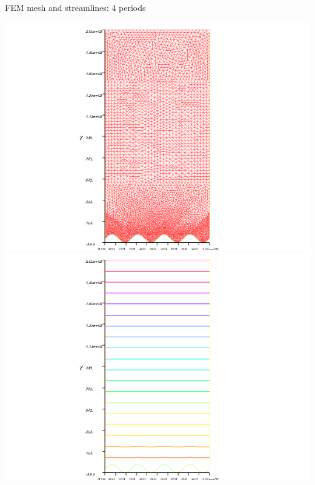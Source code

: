 \documentclass{beamer}
\begin{document}
\begin{frame}{FEM mesh and streamlines: 4 periods}

\begin{center}
\includegraphics[scale=0.4, trim=4cm 0cm 4cm 0cm, clip=true]{FEM_mesh_4.png}
\includegraphics[scale=0.4, trim=4cm 0cm 4cm 0cm, clip=true]{FEM_streamlines_4.png}
\end{center}

\end{frame}
\end{document}
